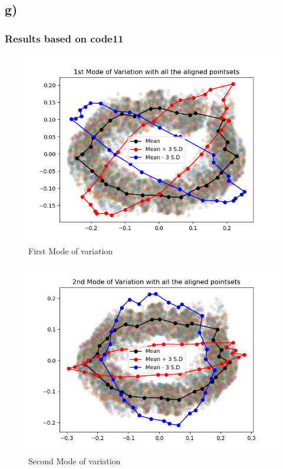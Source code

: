 \documentclass{article}
\begin{document}
\newpage
\thispagestyle{fancy}

\subsection{g)}
\subsubsection{Results based on code11}
\begin{figure}[H]
    \centerline{\includegraphics[scale=0.45]{../results/ellipses/mean-and-first-mode.png}}
    \caption{First Mode of variation}
\end{figure}

\begin{figure}[H]
    \centerline{\includegraphics[scale=0.45]{../results/ellipses/mean-and-second-mode.png}}
    \caption{Second Mode of variation}
\end{figure}
\end{document}
